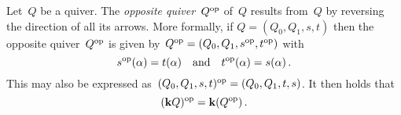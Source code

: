 \begin{example}
  Let~$Q$ be a quiver.
  The \emph{opposite quiver}~$Q^{\mathrm{op}}$ of~$Q$ results from~$Q$ by reversing the direction of all its arrows.
  More formally, if $Q = (Q_0, Q_1, s, t)$ then the opposite quiver~$Q^{\mathrm{op}}$ is given by~$Q^{\mathrm{op}} = (Q_0, Q_1, s^{\mathrm{op}}, t^{\mathrm{op}})$ with
  \[
      s^{\mathrm{op}}(\alpha)
    = t(\alpha)
    \quad\text{and}\quad
      t^{\mathrm{op}}(\alpha)
    = s(\alpha) \,.
  \]
  This may also be expressed as~$(Q_0, Q_1, s, t)^{\mathrm{op}} = (Q_0, Q_1, t, s)$.
  It then holds that
  \[
    (\mathbf{k} Q)^{\mathrm{op}} = \mathbf{k} (Q^{\mathrm{op}}) \,.
  \]
\end{example}





